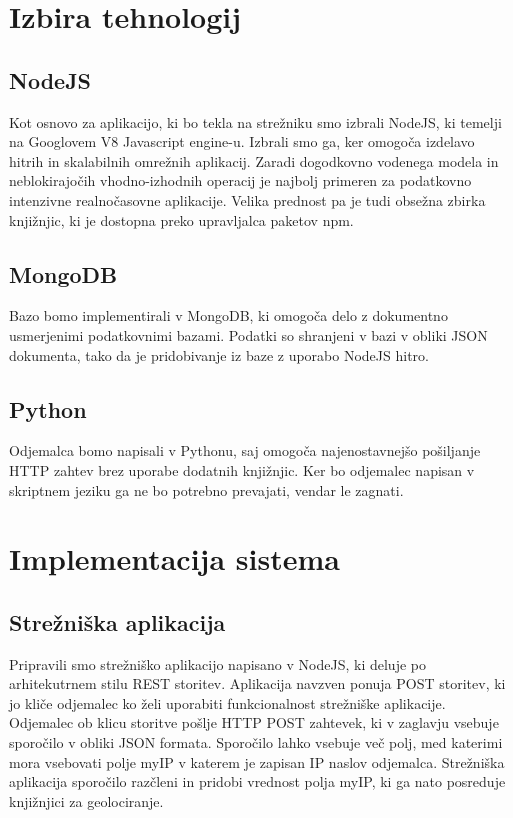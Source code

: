 \documentclass[11pt]{article}
\begin{document}
\section{Izbira tehnologij}
\subsection{NodeJS}
Kot osnovo za aplikacijo, ki bo tekla na strežniku smo izbrali NodeJS, ki temelji na Googlovem V8 Javascript engine-u. Izbrali smo ga, ker omogoča izdelavo hitrih in skalabilnih omrežnih aplikacij. Zaradi dogodkovno vodenega modela in neblokirajočih vhodno-izhodnih operacij je najbolj primeren za podatkovno intenzivne realnočasovne aplikacije. Velika prednost pa je tudi obsežna zbirka knjižnjic, ki je dostopna preko upravljalca paketov npm.

\subsection{MongoDB}
Bazo bomo implementirali v MongoDB, ki omogoča delo z dokumentno usmerjenimi podatkovnimi bazami. Podatki so shranjeni v bazi v obliki JSON dokumenta, tako da je pridobivanje iz baze z uporabo NodeJS hitro.

\subsection{Python}
Odjemalca bomo napisali v Pythonu, saj omogoča najenostavnejšo pošiljanje HTTP zahtev brez uporabe dodatnih knjižnjic. Ker bo odjemalec napisan v skriptnem jeziku ga ne bo potrebno prevajati, vendar le zagnati.


\section{Implementacija sistema}

\subsection{Strežniška aplikacija}
Pripravili smo strežniško aplikacijo napisano v NodeJS, ki deluje po arhitekutrnem stilu REST storitev. Aplikacija navzven ponuja POST storitev, ki jo kliče odjemalec ko želi uporabiti funkcionalnost strežniške aplikacije.\\

\noindent
Odjemalec ob klicu storitve pošlje HTTP POST zahtevek, ki v zaglavju vsebuje sporočilo v obliki JSON formata. Sporočilo lahko vsebuje več polj, med katerimi mora vsebovati polje myIP v katerem je zapisan IP naslov odjemalca. Strežniška aplikacija spo\-ro\-či\-lo razčleni in pridobi vrednost polja myIP, ki ga nato posreduje knjižnjici za geolociranje.\\
\end{document}
